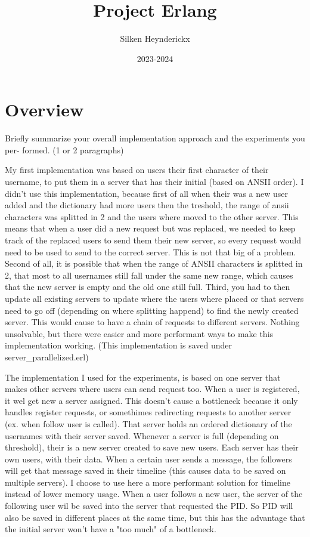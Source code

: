 \documentclass[a4paper]{article}
\title{Project Erlang}
\author{Silken Heynderickx}
\date{2023-2024}
\begin{document}
\maketitle

\tableofcontents

\newpage

\section{Overview}

Briefly summarize your overall implementation approach and the experiments you per-
formed. (1 or 2 paragraphs)

My first implementation was based on users their first character of their username, to put them in a server that has their initial (based on ANSII order). I didn't use this implementation, because first of all when their was a new user added and the dictionary had more users then the treshold, the range of ansii characters was splitted in 2 and the users where moved to the other server. This means that when a user did a new request but was replaced, we needed to keep track of the replaced users to send them their new server, so every request would need to be used to send to the correct server. This is not that big of a problem. Second of all, it is possible that when the range of ANSII characters is splitted in 2, that most to all usernames still fall under the same new range, which causes that the new server is empty and the old one still full. Third, you had to then update all existing servers to update where the users where placed or that servers need to go off (depending on where splitting happend) to find the newly created server. This would cause to have a chain of requests to different servers. Nothing unsolvable, but there were easier and more performant ways to make this implementation working. 
(This implementation is saved under server\_parallelized.erl) 

The implementation I used for the experiments, is based on one server that makes other servers where users can send request too. When a user is registered, it wel get new a server assigned. This doesn't cause a bottleneck because it only handles register requests, or somethimes redirecting requests to another server (ex. when follow user is called). That server holds an ordered dictionary of the usernames with their server saved. Whenever a server is full (depending on threshold), their is a new server created to save new users. Each server has their own users, with their data. When a certain user sends a message, the followers will get that message saved in their timeline (this causes data to be saved on multiple servers). I choose to use here a more performant solution for timeline instead of lower memory usage. When a user follows a new user, the server of the following user wil be saved into the server that requested the PID. So PID will also be saved in different places at the same time, but this has the advantage that the initial server won't have a "too much" of a bottleneck. 
\end{document}
